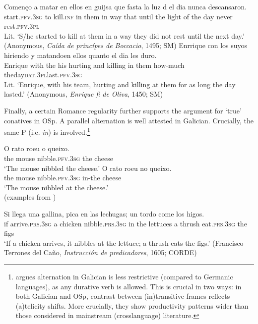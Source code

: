 \documentclass[output=paper,colorlinks,citecolor=brown,
]{langscibook}
\begin{document}
\ea
  \ea \label{ex:mangialavori:hasta}
    \gll Començo a matar en ellos en guijsa que fasta la luz d el dia nunca descansaron.\\
start.\textsc{pfv}.\textsc{3sg} to kill.\textsc{inf} in them in way that until the light of the day never rest.\textsc{pfv}.\textsc{3pl}\\
    \glt Lit. ‘S/he started to kill at them in a way they did not rest until the next day.’ (Anonymous, \textit{Caída de princípes de Boccacio}, 1495; SM)
  \ex \label{ex:mangialavori:quanto}
    \gll Enrrique con los suyos hiriendo y matandoen ellos quanto el dia les duro.\\
Enrique with the his hurting and killing in them how-much theday\textsc{dat}.\textsc{3pl}last.\textsc{pfv}.\textsc{3sg}\\
    \glt Lit. ‘Enrique, with his team, hurting and killing at them for as long the day lasted.’ (Anonymous, \textit{Enrique fi de Oliva}, 1450; SM) 
  \z 
\z 

Finally, a certain Romance regularity further supports the argument for ‘true’ conatives in OSp. A parallel alternation is well attested in Galician. Crucially, the same P (i.e. \textit{in}) is involved.\footnote{\citet[117]{Miguez2016} argues alternation in Galician is less restrictive (compared to Germanic languages), as any durative verb is allowed. This is crucial in two ways: in both Galician and OSp, contrast between (in)transitive frames reflects (a)telicity shifts. More crucially, they show productivity patterns wider than those considered in mainstream (crosslanguage) literature.}

\ea
  \ea
    \gll O rato roeu o queixo.\\
the mouse nibble.\textsc{pfv}.\textsc{3sg} the cheese\\
    \glt ‘The mouse nibbled the cheese.’
  \ex
    \gll O rato roeu no queixo.\\
the mouse nibble.\textsc{pfv}.\textsc{3sg} in-the cheese\\
    \glt ‘The mouse nibbled at the cheese.’ \\ 
    (examples from \citealt[169]{Miguez2016}) 
  \z 
\z 

\ea\label{ex:mangialavori:lechugas}
    \gll Si llega una gallina, pica en las lechugas; un tordo come los higos.\\
if arrive.\textsc{prs}.\textsc{3sg} a chicken nibble.\textsc{prs}.\textsc{3sg} in the lettuces a thrush eat.\textsc{prs}.\textsc{3sg} the figs\\
    \glt ‘If a chicken arrives, it nibbles at the lettuce; a thrush eats the figs.’ (Francisco Terrones del Caño, \textit{Instrucción de predicadores}, 1605; CORDE)
\z
\end{document}
